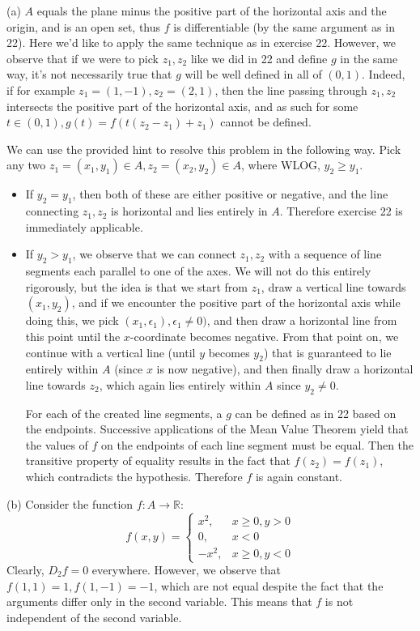 \begin{solution}

    (a) $A$ equals the plane minus the positive part of the horizontal axis and the origin, and is an open set, thus $f$ is differentiable (by the same argument as in 22). Here we'd like to apply the same technique as in exercise 22. 
    However, we observe that if we were to pick $z_1, z_2$ like we did in 22 and define $g$ in the same way, it's not necessarily true that $g$ will be well defined in all of $(0, 1)$. 
    Indeed, if for example $z_1 = (1, -1), z_2 = (2, 1)$, then the line passing through $z_1, z_2$ intersects the positive part of the horizontal axis, and as such for some $t \in (0, 1), g(t) = f(t(z_2 - z_1) + z_1)$ cannot be defined.

    We can use the provided hint to resolve this problem in the following way. Pick any two $z_1 = (x_1, y_1) \in A, z_2 = (x_2, y_2) \in A$, where WLOG, $y_2 \geq y_1$. 
    \begin{itemize}
        \item     If $y_2 = y_1$, then both of these are either positive or negative, and the line connecting $z_1, z_2$ is horizontal and lies entirely in $A$. Therefore exercise 22 is immediately applicable.
        \item  If $y_2 > y_1$, we observe that we can connect $z_1, z_2$ with a sequence of line segments each parallel to one of the axes.
        We will not do this entirely rigorously, but the idea is that we start from $z_1$, draw a vertical line towards $(x_1, y_2)$, and if we encounter the positive part of the horizontal axis while doing this, we pick $(x_1, \epsilon_1), \epsilon_1 \neq 0)$, and then draw a horizontal line from this point until the $x$-coordinate becomes negative.
        From that point on, we continue with a vertical line (until $y$ becomes $y_2$) that is guaranteed to lie entirely within $A$ (since $x$ is now negative), and then finally draw a horizontal line towards $z_2$, which again lies entirely within $A$ since $y_2 \neq 0$.

        For each of the created line segments, a $g$ can be defined as in 22 based on the endpoints.
        Successive applications of the Mean Value Theorem yield that the values of $f$ on the endpoints of each line segment must be equal.
        Then the transitive property of equality results in the fact that $f(z_2) = f(z_1)$, which contradicts the hypothesis.
        Therefore $f$ is again constant.
    \end{itemize}

    (b) Consider the function $f: A \rightarrow \mathbb{R}$:
    $$f(x, y) = \begin{cases}
        x^2,  & x \geq 0, y > 0 \\
        0, & x < 0 \\
        -x^2, & x \geq 0, y  < 0
    \end{cases}$$
    Clearly, $D_2 f = 0$ everywhere.
    However, we observe that $f(1, 1) = 1, f(1, -1) = -1$, which are not equal despite the fact that the arguments differ only in the second variable.
    This means that $f$ is not independent of the second variable.
\end{solution}

